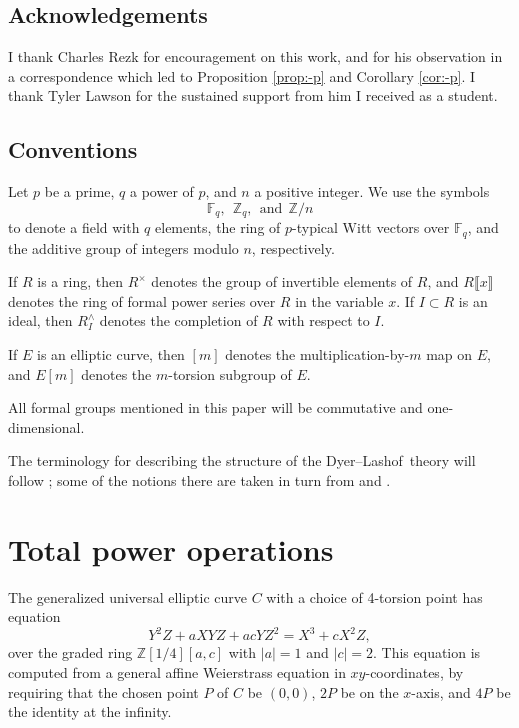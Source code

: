\documentclass{gtpart}
\theoremstyle{definition}
\theoremstyle{remark}
\newcommand{\mb}[1]{\mathbb{#1}}
\newcommand{\DL}{Dyer--Lashof~}
\newcommand{\BF}{{\mb F}}
\newcommand{\BZ}{{\mb Z}}
\begin{document}
\subsection*{Acknowledgements}

I thank Charles Rezk for encouragement on this work, and for his observation in a correspondence which led to Proposition \ref{prop:-p} and Corollary \ref{cor:-p}.  
I thank Tyler Lawson for the sustained support from him I received as a student.  


\subsection*{Conventions}

Let $p$ be a prime, $q$ a power of $p$, and $n$ a positive integer.  We use the symbols 
\[
 \BF_q,~~\BZ_q,~~\text{and}~~\BZ/n 
\]
to denote a field with $q$ elements, the ring of $p$-typical Witt vectors over $\BF_q$, 
and the additive group of integers modulo $n$, respectively.  

If $R$ is a ring, then $R^\times$ denotes the group of invertible elements of $R$, 
and $R\llbracket x \rrbracket$ denotes the ring of formal power series over $R$ in the variable $x$.  
If $I \subset R$ is an ideal, then $R_I^\wedge$ denotes the completion of $R$ with respect to $I$.  

If $E$ is an elliptic curve, then $[m]$ denotes the multiplication-by-$m$ map on $E$, and $E[m]$ denotes the $m$-torsion subgroup of $E$.  

All formal groups mentioned in this paper will be commutative and one-dimensional.  

The terminology for describing the structure of the \DL theory will follow \cite{cong, h2p2}; 
some of the notions there are taken in turn from \cite{BW} and \cite{V}.  


\section{Total power operations}
\label{sec:psi}

The generalized universal elliptic curve $C$ with a choice of 4-torsion point has equation 
\[
 Y^2 Z + a X Y Z + a c Y Z^2 = X^3 + c X^2 Z, 
\]
over the graded ring $\BZ [1/4] [a,c]$ with $|a| = 1$ and $|c| = 2$.  
This equation is computed from a general affine Weierstrass equation in $xy$-coordinates, 
by requiring that the chosen point $P$ of $C$ be $(0,0)$, $2P$ be on the $x$-axis, and $4P$ be the identity at the infinity.  
\end{document}
